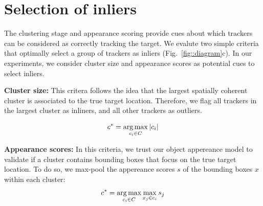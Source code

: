 \section{Selection of inliers}
\label{sec:inliers}
The clustering stage and appearance scoring provide cues about which trackers
can be considered as correctly tracking the target.
We evalute two simple criteria that optimally select a group of trackers as
inliers (Fig.~\ref{fig::diagram}c).
In our experiments, we consider cluster size and appearance scores as
potential cues to select inliers.


\textbf{Cluster size:}
This critera follows the idea that the largest spatially coherent cluster
is associated to the true target location. Therefore, we flag all trackers
in the largest cluster as inliners, and all other trackers as outliers.

\begin{equation}
 c^{*} = \operatorname*{arg\,max}_{c_i\in C} |c_i|
\end{equation}


\textbf{Appearance scores:}
In this criteria, we trust our object appereance model to validate if a cluster
contains bounding boxes that focus on the true target location.
To do so, we max-pool the appereance scores $s$ of the bounding boxes $x$ within
each cluster:
\begin{equation}
 c^{*} = \operatorname*{arg\,max}_{c_i\in C} \max_{x_j \in c_i} s_{j}
\end{equation}

